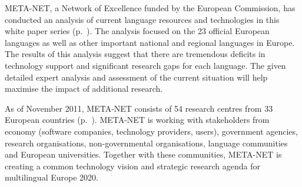 \documentclass[]{../../metanetpaper}
\begin{document}
\begin{Parallel}[c]{78mm}{78mm}
{META-NET, a Network of Excellence funded by the European Commission, has conducted an  analysis of current language resources and technologies in this white paper series (p.~\pageref{whitepaperseries}). The analysis focused on the 23 official European languages as well as other important national and regional languages in Europe. The results of this analysis suggest that there are tremendous deficits in technology support and significant research gaps for each language. The given detailed expert analysis and assessment of the current situation will help maximise the impact of additional research.

As of November 2011, META-NET consists of 54 research centres from 33 European countries (p.~\pageref{metanetmembers}). META-NET is working with stakeholders from economy (software companies, technology providers, users), government agencies, research organisations, non-governmental organisations, language communities and European universities. Together with these communities, META-NET is creating a common technology vision and strategic research agenda for multilingual Europe 2020.} 
\ParallelPar
\end{Parallel}


\cleardoublepage


\tableofcontents



\cleardoublepage

\setcounter{page}{1}
\pagestyle{scrheadings}


\end{document}
